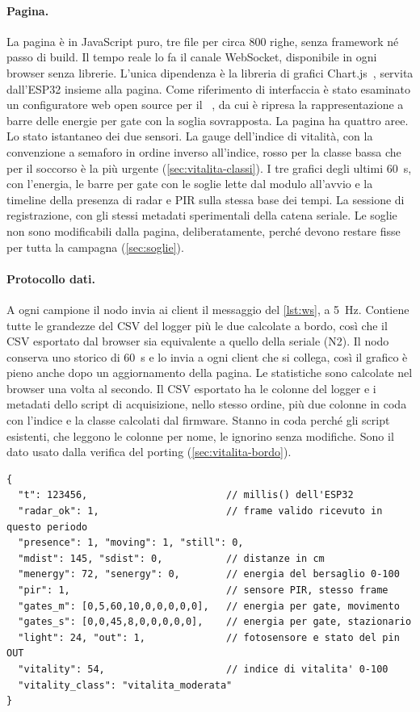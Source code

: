 \paragraph{Pagina.} La pagina è in JavaScript puro, tre file per circa 800 righe,
senza framework né passo di build. Il tempo reale lo fa il canale WebSocket,
disponibile in ogni browser senza librerie. L'unica dipendenza è la libreria di
grafici Chart.js~\cite{chartjs}, servita dall'ESP32 insieme alla pagina. Come
riferimento di interfaccia è stato esaminato un configuratore web open source per
il \ldb~\cite{ld2410configurator}, da cui è ripresa la rappresentazione a barre delle
energie per gate con la soglia sovrapposta. La pagina ha quattro aree. Lo stato
istantaneo dei due sensori. La gauge dell'indice di vitalità, con la convenzione a
semaforo in ordine inverso all'indice, rosso per la classe bassa che per il soccorso
è la più urgente (\cref{sec:vitalita-classi}). I tre grafici degli ultimi 60~s, con
l'energia, le barre per gate con le soglie lette dal modulo all'avvio e la timeline
della presenza di radar e PIR sulla stessa base dei tempi. La sessione di
registrazione, con gli stessi metadati sperimentali della catena seriale. Le soglie
non sono modificabili dalla pagina, deliberatamente, perché devono restare fisse per
tutta la campagna (\cref{sec:soglie}).

\paragraph{Protocollo dati.} A ogni campione il nodo invia ai client il messaggio del
\cref{lst:ws}, a 5~Hz. Contiene tutte le grandezze del CSV del logger più le due
calcolate a bordo, così che il CSV esportato dal browser sia equivalente a quello
della seriale (N2). Il nodo conserva uno storico di 60~s e lo invia a ogni client che
si collega, così il grafico è pieno anche dopo un aggiornamento della pagina. Le
statistiche sono calcolate nel browser una volta al secondo. Il CSV esportato ha le
colonne del logger e i metadati dello script di acquisizione, nello stesso ordine,
più due colonne in coda con l'indice e la classe calcolati dal firmware. Stanno in
coda perché gli script esistenti, che leggono le colonne per nome, le ignorino senza
modifiche. Sono il dato usato dalla verifica del porting (\cref{sec:vitalita-bordo}).

\begin{lstlisting}[caption={Messaggio WebSocket inviato a 5~Hz a ogni client collegato.},
label={lst:ws},basicstyle=\ttfamily\scriptsize]
{
  "t": 123456,                        // millis() dell'ESP32
  "radar_ok": 1,                      // frame valido ricevuto in questo periodo
  "presence": 1, "moving": 1, "still": 0,
  "mdist": 145, "sdist": 0,           // distanze in cm
  "menergy": 72, "senergy": 0,        // energia del bersaglio 0-100
  "pir": 1,                           // sensore PIR, stesso frame
  "gates_m": [0,5,60,10,0,0,0,0,0],   // energia per gate, movimento
  "gates_s": [0,0,45,8,0,0,0,0,0],    // energia per gate, stazionario
  "light": 24, "out": 1,              // fotosensore e stato del pin OUT
  "vitality": 54,                     // indice di vitalita' 0-100
  "vitality_class": "vitalita_moderata"
}
\end{lstlisting}

